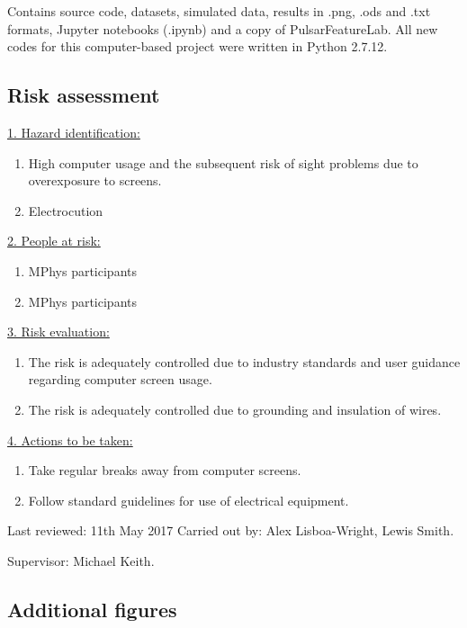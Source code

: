 \documentclass[12pt]{article}
\begin{document}
Contains source code, datasets, simulated data, results in .png, .ods and .txt formats, Jupyter notebooks (.ipynb) and a copy of PulsarFeatureLab. All new codes for this computer-based project were written in Python 2.7.12.

\subsection{Risk assessment}
\underline{1. Hazard identification:}
\begin{enumerate}[label=(\roman*)]
\item High computer usage and the subsequent risk of sight problems due to overexposure to screens.
\item Electrocution
\end{enumerate}
\underline{2. People at risk:}
\begin{enumerate}[label=(\roman*)]
\item MPhys participants
\item MPhys participants
\end{enumerate}
\underline{3. Risk evaluation:}
\begin{enumerate}[label=(\roman*)]
\item The risk is adequately controlled due to industry standards and user guidance regarding computer screen usage.
\item The risk is adequately controlled due to grounding and insulation of wires.
\end{enumerate}
\underline{4. Actions to be taken:}
\begin{enumerate}[label=(\roman*)]
\item Take regular breaks away from computer screens.
\item Follow standard guidelines for use of electrical equipment.
\end{enumerate}
Last reviewed: 11th May 2017 \newline
Carried out by: Alex Lisboa-Wright, Lewis Smith.

Supervisor: Michael Keith.

\subsection{Additional figures}
\end{document}

